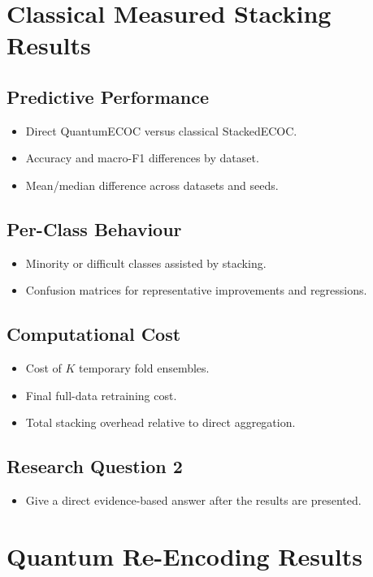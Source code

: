 \documentclass[]{UCD_CS_MSc_AAI_Report}
\begin{document}
\section{Classical Measured Stacking Results}
\label{sec:results-classical-stacking}

\subsection{Predictive Performance}
\begin{itemize}
    \item Direct QuantumECOC versus classical StackedECOC.
    \item Accuracy and macro-F1 differences by dataset.
    \item Mean/median difference across datasets and seeds.
\end{itemize}

\subsection{Per-Class Behaviour}
\begin{itemize}
    \item Minority or difficult classes assisted by stacking.
    \item Confusion matrices for representative improvements and regressions.
\end{itemize}

\subsection{Computational Cost}
\begin{itemize}
    \item Cost of $K$ temporary fold ensembles.
    \item Final full-data retraining cost.
    \item Total stacking overhead relative to direct aggregation.
\end{itemize}

\subsection{Research Question 2}
\begin{itemize}
    \item Give a direct evidence-based answer after the results are presented.
\end{itemize}

\section{Quantum Re-Encoding Results}
\label{sec:results-reencoding}
\end{document}

